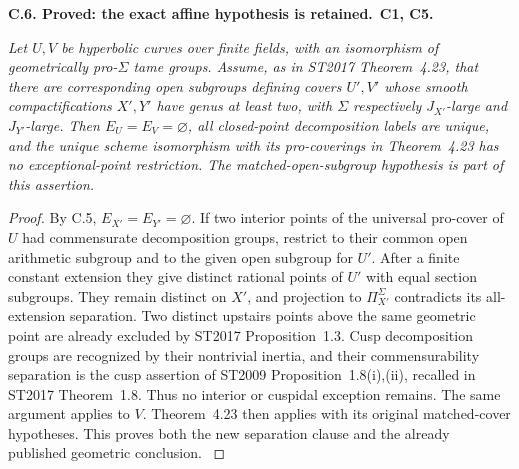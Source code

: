 \documentclass[11pt,a4paper]{article}
\newenvironment{claim}[3]{\par\medskip\noindent\hypertarget{#1}{\textbf{#1. #2.}}\ \textbf{#3.}\par\nopagebreak\smallskip\begingroup\itshape}{\endgroup\par\smallskip}
\begin{document}
\begin{claim}{C.6}{Proved: the exact affine hypothesis is retained}{C1, C5}
Let $U,V$ be hyperbolic curves over finite fields, with an
isomorphism of geometrically pro-$\Sigma$ tame groups. Assume,
as in ST2017 Theorem~4.23, that there are corresponding open
subgroups defining covers $U',V'$ whose smooth compactifications
$X',Y'$ have genus at least two, with $\Sigma$ respectively
$J_{X'}$-large and $J_{Y'}$-large. Then $E_U=E_V=\varnothing$,
all closed-point decomposition labels are unique, and the unique
scheme isomorphism with its pro-coverings in Theorem~4.23 has
no exceptional-point restriction. The matched-open-subgroup
hypothesis is part of this assertion.
\end{claim}
\begin{proof}
By C.5, $E_{X'}=E_{Y'}=\varnothing$. If two interior points
of the universal pro-cover of $U$ had commensurate decomposition
groups, restrict to their common open arithmetic subgroup and to
the given open subgroup for $U'$. After a finite constant
extension they give distinct rational points of $U'$ with equal
section subgroups. They remain distinct on $X'$, and projection
to $\Pi_{X'}^\Sigma$ contradicts its all-extension separation.
Two distinct upstairs points above the same geometric point are
already excluded by ST2017 Proposition~1.3. Cusp decomposition
groups are recognized by their nontrivial inertia, and their
commensurability separation is the cusp assertion of ST2009
Proposition~1.8(i),(ii), recalled in ST2017 Theorem~1.8. Thus
no interior or cuspidal exception remains. The same argument
applies to $V$. Theorem~4.23 then applies with its original
matched-cover hypotheses. This proves both the new separation
clause and the already published geometric conclusion.
\citep[Proposition~1.3, Theorems~1.8 and 4.23]{LA_ST2017}
\end{proof}
\end{document}
